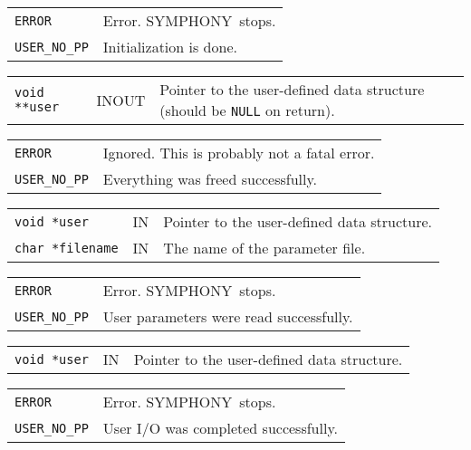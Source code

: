 \documentclass[twoside,11pt]{article}
\begin{document}
{\newpage
\clearpage
\samepage \begin{tabular}{lp{300pt}}
{\tt ERROR} & Error. {\sc SYMPHONY}\ stops. \\ 
{\tt USER\_NO\_PP} & Initialization is done. \\ 
\end{tabular}
}

{\newpage
\clearpage
\samepage \begin{tabular}{llp{280pt}}
{\tt void **user} & INOUT & Pointer to the user-defined data structure
(should be {\tt NULL} on return). \\ 
\end{tabular}
}

{\newpage
\clearpage
\samepage \begin{tabular}{lp{300pt}}
{\tt ERROR} & Ignored. This is probably not a fatal error.\\ 
{\tt USER\_NO\_PP} & Everything was freed successfully. \\ 
\end{tabular}
}

{\newpage
\clearpage
\samepage \begin{tabular}{llp{280pt}}
{\tt void *user} & IN & Pointer to the user-defined data structure. \\ 
{\tt char *filename} & IN & The name of the parameter file. \\ 
\end{tabular}
}

{\newpage
\clearpage
\samepage \begin{tabular}{lp{300pt}}
{\tt ERROR} & Error. {\sc SYMPHONY}\ stops. \\ 
{\tt USER\_NO\_PP} & User parameters were read successfully. \\ 
\end{tabular}
}

{\newpage
\clearpage
\samepage \begin{tabular}{llp{280pt}}
{\tt void *user} & IN & Pointer to the user-defined data structure. \\ 
\end{tabular}
}

{\newpage
\clearpage
\samepage \begin{tabular}{lp{300pt}}
{\tt ERROR} & Error. {\sc SYMPHONY}\ stops. \\ 
{\tt USER\_NO\_PP} & User I/O was completed successfully. \\ 
\end{tabular}
}
\end{document}
